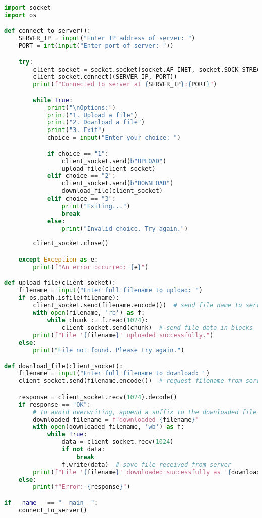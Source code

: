 \documentclass{article}
\begin{document}
\begin{lstlisting}[language=Python]
import socket
import os

def connect_to_server():
    SERVER_IP = input("Enter IP address of server: ") 
    PORT = int(input("Enter port of server: "))  

    try:
        client_socket = socket.socket(socket.AF_INET, socket.SOCK_STREAM)
        client_socket.connect((SERVER_IP, PORT))
        print(f"Connected to server at {SERVER_IP}:{PORT}")

        while True:
            print("\nOptions:")
            print("1. Upload a file")
            print("2. Download a file")
            print("3. Exit")
            choice = input("Enter your choice: ")

            if choice == "1":
                client_socket.send(b"UPLOAD")
                upload_file(client_socket)
            elif choice == "2":
                client_socket.send(b"DOWNLOAD")
                download_file(client_socket)
            elif choice == "3":
                print("Exiting...")
                break
            else:
                print("Invalid choice. Try again.")
        
        client_socket.close()

    except Exception as e:
        print(f"An error occurred: {e}")

def upload_file(client_socket):
    filename = input("Enter full filename to upload: ")
    if os.path.isfile(filename):
        client_socket.send(filename.encode())  # send file name to server
        with open(filename, 'rb') as f:
            while chunk := f.read(1024):
                client_socket.send(chunk)  # send file data in blocks
        print(f"File '{filename}' uploaded successfully.")
    else:
        print("File not found. Please try again.")

def download_file(client_socket):
    filename = input("Enter full filename to download: ")
    client_socket.send(filename.encode())  # request filename from server

    response = client_socket.recv(1024).decode()
    if response == "OK":
        # To avoid overwriting, append a suffix to the downloaded file
        downloaded_filename = f"downloaded_{filename}"
        with open(downloaded_filename, 'wb') as f:
            while True:
                data = client_socket.recv(1024)
                if not data:
                    break
                f.write(data)  # save file received from server
        print(f"File '{filename}' downloaded successfully as '{downloaded_filename}'.")
    else:
        print(f"Error: {response}")

if __name__ == "__main__":
    connect_to_server()
\end{lstlisting}
\end{document}
